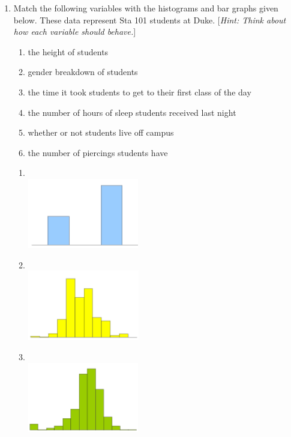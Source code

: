 \documentclass[12pt]{article}
\begin{document}
\begin{enumerate}
%

\item Match the following variables with the histograms and bar graphs given below. These data represent Sta 101 students at Duke. [\textit{Hint: Think about how each variable should behave.}]

\begin{multicols}{2}
\begin{enumerate}
\item the height of students
\item gender breakdown of students
\item the time it took students to get to their first class of the day
\item the number of hours of sleep students received last night
\item whether or not students live off campus
\item the number of piercings students have
\end{enumerate}
\end{multicols}

\begin{multicols}{3}

\begin{enumerate}

\item[(1)] $\:$ \\
\includegraphics[height=1.2in]{figures/gender}

\item[(2)] $\:$ \\
\includegraphics[height=1.2in]{figures/height}

\item[(3)] $\:$ \\
\includegraphics[height=1.2in]{figures/sleep}


\end{enumerate}
\end{multicols}
\end{enumerate}
\end{document}
